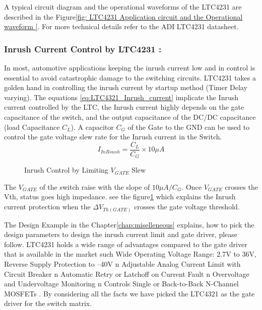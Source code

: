 A typical circuit diagram and the operational waveforms of the LTC4231 are described in the Figure\ref{fig: LTC4231 Application circuit and the Operational waveform }. 
For more technical details refer to the ADI LTC4231 datasheet\cite{LTC4231_User_Datasheet}.

\subsubsection{Inrush Current Control by LTC4231 :}
In most, automotive applications keeping the inrush current low and in control is essential to avoid catastrophic damage to the switching circuits. LTC4231 takes a golden hand in controlling the inrush current by startup method (Timer Delay varying). The equations \ref{eq:LTC4321_Inrush_current} implicate the Inrush current controlled by the LTC, the Inrush current highly depends on the gate capacitance of the switch, and the output capacitance of the DC/DC capacitance (load Capacitance $C_L$). A capacitor $C_G$ of the Gate to the GND can be used to control the gate voltage slew rate for the Inrush current in the Switch.
\begin{equation}\label{eq:LTC4321_Inrush_current}
    I_{InRsush} = \frac{C_{L}}{C_{G}} \times 10\mu A
\end{equation}
\begin{figure}[h]
	\centering
    \caption{Inrush Control by Limiting $V_{GATE}$ Slew}
    \label{fig: LTC4231 Inrush Control by Limiting Vgate Slew}
\end{figure}
The $V_{GATE}$ of the switch raise with the slope of $10\mu A/C_G$.
Once $V_{GATE}$ crosses the Vth, status goes high impedance. see the figure\ref{fig: LTC4231 Inrush Control by Limiting Vgate Slew} which explains the Inrush current protection when the $\Delta V_{Th(GATE)}$ crosses the gate voltage threshold.

The Design Example in the Chapter\ref{chap:miselleneous} explains, how to pick the design parameters to design the inrush current limit and gate driver, please follow. LTC4231 holds a wide range of advantages compared to the gate driver that is available in the market such Wide Operating Voltage Range: 2.7V to 36V, Reverse Supply Protection to –40V n Adjustable Analog Current Limit with Circuit Breaker n Automatic Retry or Latchoff on Current Fault n Overvoltage and Undervoltage Monitoring n Controls Single or Back-to-Back N-Channel MOSFETs \cite{LTC4231_User_Datasheet}. By considering all the facts we have picked the LTC4321 as the gate driver for the switch matrix.